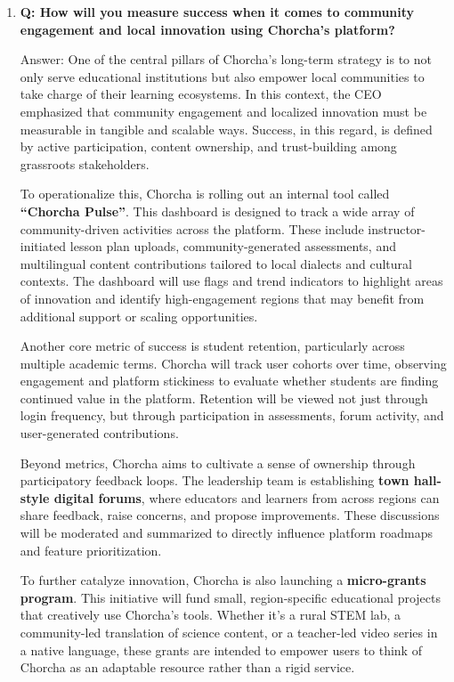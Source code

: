 \documentclass[12pt,a4paper,oneside]{book}
\begin{document}
\begin{enumerate}
\item \textbf{Q: How will you measure success when it comes to community engagement and local innovation using Chorcha’s platform?}

Answer: One of the central pillars of Chorcha’s long-term strategy is to not only serve educational institutions but also empower local communities to take charge of their learning ecosystems. In this context, the CEO emphasized that community engagement and localized innovation must be measurable in tangible and scalable ways. Success, in this regard, is defined by active participation, content ownership, and trust-building among grassroots stakeholders.

To operationalize this, Chorcha is rolling out an internal tool called \textbf{“Chorcha Pulse”}. This dashboard is designed to track a wide array of community-driven activities across the platform. These include instructor-initiated lesson plan uploads, community-generated assessments, and multilingual content contributions tailored to local dialects and cultural contexts. The dashboard will use flags and trend indicators to highlight areas of innovation and identify high-engagement regions that may benefit from additional support or scaling opportunities.

Another core metric of success is student retention, particularly across multiple academic terms. Chorcha will track user cohorts over time, observing engagement and platform stickiness to evaluate whether students are finding continued value in the platform. Retention will be viewed not just through login frequency, but through participation in assessments, forum activity, and user-generated contributions.

Beyond metrics, Chorcha aims to cultivate a sense of ownership through participatory feedback loops. The leadership team is establishing \textbf{town hall-style digital forums}, where educators and learners from across regions can share feedback, raise concerns, and propose improvements. These discussions will be moderated and summarized to directly influence platform roadmaps and feature prioritization.

To further catalyze innovation, Chorcha is also launching a \textbf{micro-grants program}. This initiative will fund small, region-specific educational projects that creatively use Chorcha’s tools. Whether it's a rural STEM lab, a community-led translation of science content, or a teacher-led video series in a native language, these grants are intended to empower users to think of Chorcha as an adaptable resource rather than a rigid service.


\end{enumerate}
\end{document}
